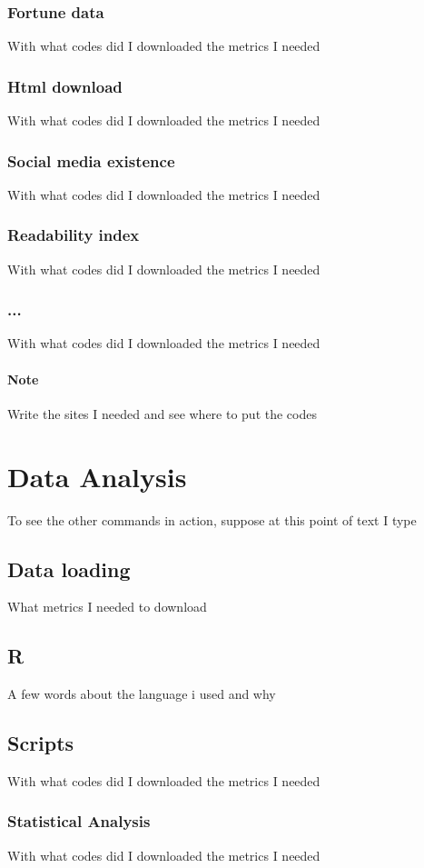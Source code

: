 \documentclass{article}
\begin{document}
\subsubsection{Fortune data}
With what codes did I downloaded the metrics I needed
\subsubsection{Html download}
With what codes did I downloaded the metrics I needed
\subsubsection{Social media existence}
With what codes did I downloaded the metrics I needed
\subsubsection{Readability index}
With what codes did I downloaded the metrics I needed
\subsubsection{...}
With what codes did I downloaded the metrics I needed
\paragraph{Note}
Write the sites I needed and see where to put the codes
\pagebreak  
\section{Data Analysis}
To see the other commands in action, suppose at this point of text I type
\subsection{Data loading}
What metrics I needed to download
\subsection{R}
A few words about the language i used and why
\subsection{Scripts}
With what codes did I downloaded the metrics I needed
\subsubsection{Statistical Analysis}
With what codes did I downloaded the metrics I needed
\end{document}
